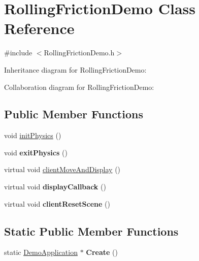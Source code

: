 \hypertarget{class_rolling_friction_demo}{\section{Rolling\+Friction\+Demo Class Reference}
\label{class_rolling_friction_demo}
}


{\ttfamily \#include $<$Rolling\+Friction\+Demo.\+h$>$}



Inheritance diagram for Rolling\+Friction\+Demo\+:


Collaboration diagram for Rolling\+Friction\+Demo\+:
\subsection*{Public Member Functions}
\begin{DoxyCompactItemize}
\item 
void \hyperlink{class_rolling_friction_demo_a1478d5c8673d1a5611bd5c5c1d0b3f25}{init\+Physics} ()
\item 
\hypertarget{class_rolling_friction_demo_a7d624a63cbbef9f8376342638fab89d4}{void {\bfseries exit\+Physics} ()}\label{class_rolling_friction_demo_a7d624a63cbbef9f8376342638fab89d4}

\item 
virtual void \hyperlink{class_rolling_friction_demo_afe0395dd6a307d77b2464daaf25b0891}{client\+Move\+And\+Display} ()
\item 
\hypertarget{class_rolling_friction_demo_a9338ff79d53affb24131102222067c71}{virtual void {\bfseries display\+Callback} ()}\label{class_rolling_friction_demo_a9338ff79d53affb24131102222067c71}

\item 
\hypertarget{class_rolling_friction_demo_ae05302be881e6975e789a2e022e8ce57}{virtual void {\bfseries client\+Reset\+Scene} ()}\label{class_rolling_friction_demo_ae05302be881e6975e789a2e022e8ce57}

\end{DoxyCompactItemize}
\subsection*{Static Public Member Functions}
\begin{DoxyCompactItemize}
\item 
\hypertarget{class_rolling_friction_demo_a4c02d0473136abc36252f9a2dc234f3f}{static \hyperlink{class_demo_application}{Demo\+Application} $\ast$ {\bfseries Create} ()}\label{class_rolling_friction_demo_a4c02d0473136abc36252f9a2dc234f3f}

\end{DoxyCompactItemize}


